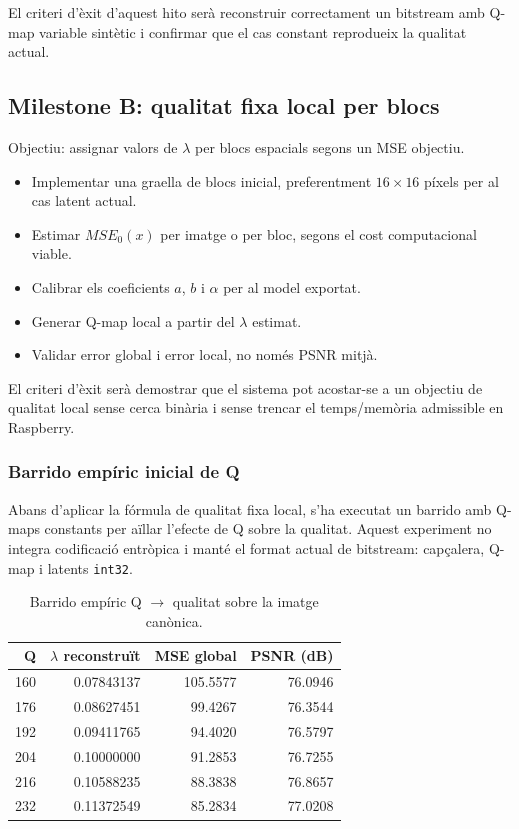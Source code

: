 \documentclass[11pt,a4paper]{article}
\begin{document}
El criteri d'èxit d'aquest hito serà reconstruir correctament un bitstream amb Q-map variable sintètic i confirmar que el cas constant reprodueix la qualitat actual.

\subsection{Milestone B: qualitat fixa local per blocs}

Objectiu: assignar valors de $\lambda$ per blocs espacials segons un MSE objectiu.

\begin{itemize}
  \item Implementar una graella de blocs inicial, preferentment $16 \times 16$ píxels per al cas latent actual.
  \item Estimar $MSE_0(x)$ per imatge o per bloc, segons el cost computacional viable.
  \item Calibrar els coeficients $a$, $b$ i $\alpha$ per al model exportat.
  \item Generar Q-map local a partir del $\lambda$ estimat.
  \item Validar error global i error local, no només PSNR mitjà.
\end{itemize}

El criteri d'èxit serà demostrar que el sistema pot acostar-se a un objectiu de qualitat local sense cerca binària i sense trencar el temps/memòria admissible en Raspberry.

\subsubsection{Barrido empíric inicial de Q}

Abans d'aplicar la fórmula de qualitat fixa local, s'ha executat un barrido amb Q-maps constants per aïllar l'efecte de Q sobre la qualitat. Aquest experiment no integra codificació entròpica i manté el format actual de bitstream: capçalera, Q-map i latents \texttt{int32}.

\begin{table}[H]
\centering
\begin{tabular}{rrrr}
\toprule
\textbf{Q} & \textbf{$\lambda$ reconstruït} & \textbf{MSE global} & \textbf{PSNR (dB)} \\
\midrule
160 & 0.07843137 & 105.5577 & 76.0946 \\
176 & 0.08627451 & 99.4267 & 76.3544 \\
192 & 0.09411765 & 94.4020 & 76.5797 \\
204 & 0.10000000 & 91.2853 & 76.7255 \\
216 & 0.10588235 & 88.3838 & 76.8657 \\
232 & 0.11372549 & 85.2834 & 77.0208 \\
\bottomrule
\end{tabular}
\caption{Barrido empíric Q $\rightarrow$ qualitat sobre la imatge canònica.}
\end{table}
\end{document}
